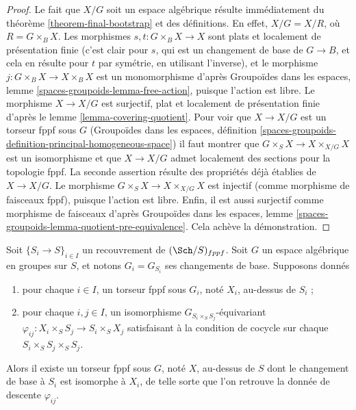 \begin{proof}
Le fait que $X/G$ soit un espace algébrique résulte immédiatement du
théorème \ref{theorem-final-bootstrap}
et des définitions. En effet, $X/G = X/R$, où $R = G \times_B X$.
Les morphismes $s, t : G \times_B X \to X$ sont plats et localement de
présentation finie (c'est clair pour $s$, qui est un changement de base de $G \to B$,
et cela en résulte pour $t$ par symétrie, en utilisant l'inverse), et le morphisme
$j : G \times_B X \to X \times_B X$ est un monomorphisme d'après
Groupoïdes dans les espaces, lemme \ref{spaces-groupoids-lemma-free-action},
puisque l'action est libre. Le morphisme $X \to X/G$ est surjectif, plat et
localement de présentation finie d'après le lemme \ref{lemma-covering-quotient}.
Pour voir que $X \to X/G$ est un torseur fppf sous $G$
(Groupoïdes dans les espaces, définition
\ref{spaces-groupoids-definition-principal-homogeneous-space})
il faut montrer que $G \times_S X \to X \times_{X/G} X$
est un isomorphisme et que $X \to X/G$ admet localement des sections pour la topologie fppf.
La seconde assertion résulte des propriétés déjà établies de $X \to X/G$.
Le morphisme $G \times_S X \to X \times_{X/G} X$ est injectif (comme morphisme de
faisceaux fppf), puisque l'action est libre. Enfin, il est aussi surjectif
comme morphisme de faisceaux d'après Groupoïdes dans les espaces, lemme
\ref{spaces-groupoids-lemma-quotient-pre-equivalence}.
Cela achève la démonstration.
\end{proof}

\begin{lemma}
\label{lemma-descent-torsor}
Soit $\{S_i \to S\}_{i \in I}$ un recouvrement de $(\Sch/S)_{fppf}$.
Soit $G$ un espace algébrique en groupes sur $S$, et notons
$G_i = G_{S_i}$ ses changements de base. Supposons donnés
\begin{enumerate}
\item pour chaque $i \in I$, un torseur fppf sous $G_i$, noté $X_i$, au-dessus de $S_i$ ;
\item pour chaque $i, j \in I$, un isomorphisme $G_{S_i \times_S S_j}$-équivariant
$\varphi_{ij} : X_i \times_S S_j \to S_i \times_S X_j$ satisfaisant à la condition
de cocycle sur chaque $S_i \times_S S_j \times_S S_j$.
\end{enumerate}
Alors il existe un torseur fppf sous $G$, noté $X$, au-dessus de $S$
dont le changement de base à $S_i$ est isomorphe à $X_i$, de telle sorte que l'on
retrouve la donnée de descente $\varphi_{ij}$.
\end{lemma}

